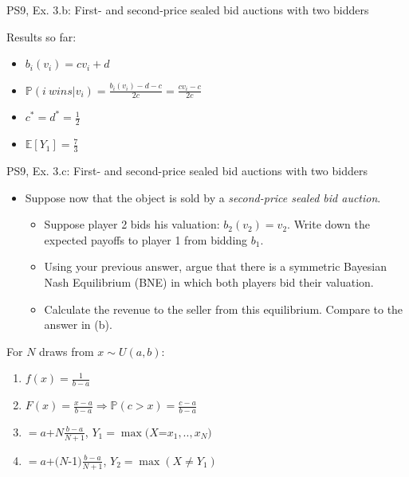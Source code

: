 \begin{frame}{PS9, Ex. 3.b: First- and second-price sealed bid auctions with two bidders}
\begin{multicols}{2}
      \vspace{-6pt}
      Results so far:
      \vspace{-6pt}
      \begin{itemize}
        \item[($*$)]  $b_i(v_i) = cv_i+d$
        \item[($**$)] $\mathbb{P}(i\ wins|v_i)=\frac{b_i(v_i)-d-c}{2c}=\frac{cv_i-c}{2c}$
        \item[(3.a)]    $c^*=d^*=\frac{1}{2}$
        \item[\nth{1}:] $\mathbb{E}[Y_1]=\frac{7}{3}$
      \end{itemize}
      \vfill\null
    \end{multicols}
\end{frame}



\begin{frame}{PS9, Ex. 3.c: First- and second-price sealed bid auctions with two bidders}
    \begin{multicols}{2}
      \begin{itemize}
        \item[(c)] Suppose now that the object is sold by a \textit{second-price sealed bid auction}.
        \begin{itemize}\normalsize
          \item[i.]   Suppose player 2 bids his valuation: $b_2(v_2) = v_2$. Write down the expected payoffs to player 1 from bidding $b_1$.
          \item[ii.]  Using your previous answer, argue that there is a symmetric Bayesian Nash Equilibrium (BNE) in which both players bid their valuation.
          \item[iii.] Calculate the revenue to the seller from this equilibrium. Compare to the answer in (b).
        \end{itemize}
      \end{itemize}
      For $N$ draws from $x\sim U(a, b):$
      \vspace{-6pt}
      \begin{enumerate}
        \item[PDF:] $f(x)=\frac{1}{b-a}$
        \item[CDF:] $F(x)=\frac{x-a}{b-a}\Rightarrow\mathbb{P}(c>x)=\frac{c-a}{b-a}$
        \item[$\mathbb{E}(Y_1)$] $=a$+$N\frac{b-a}{N+1}$, $Y_1=\max(X$=$x_1,..,x_N)$
        \item[$\mathbb{E}(Y_2)$] $=a$+$(N$-1$)\frac{b-a}{N+1}$, $Y_2=\max(X\neq Y_1)$
      \end{enumerate}
      \vfill\null\columnbreak
      \vfill\null
    \end{multicols}
\end{frame}


